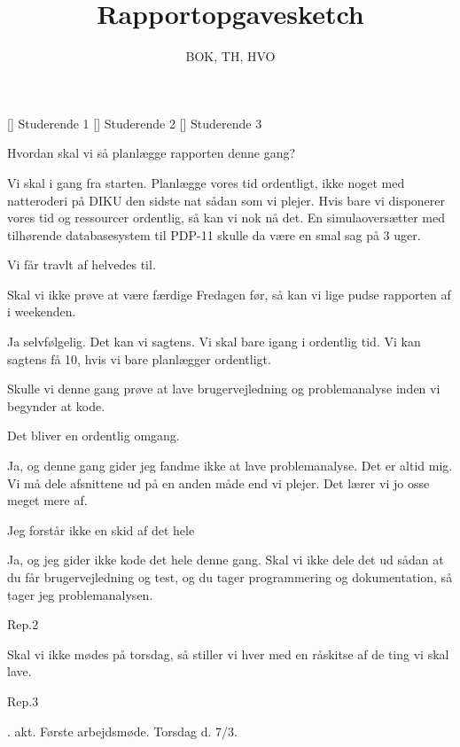 \documentclass[a4paper,11pt]{article}
\title{Rapportopgavesketch}
\author{BOK, TH, HVO}
\begin{document}
\maketitle

\begin{roles}
[] Studerende 1
[] Studerende 2
[] Studerende 3
\end{roles}

\begin{sketch}

 Hvordan skal vi så planlægge rapporten denne gang?

 Vi skal i gang fra starten. Planlægge vores tid ordentligt, 
ikke noget med natteroderi på DIKU den sidste nat sådan som vi plejer.
Hvis bare vi disponerer vores tid og ressourcer
ordentlig, så kan vi nok nå det. En simulaoversætter
med tilhørende databasesystem til PDP-11 skulle da være en
smal sag på 3 uger.

 Vi får travlt af helvedes til. 

 Skal vi ikke prøve at være færdige Fredagen før,
så kan vi lige pudse rapporten af i weekenden.

 Ja selvfølgelig. Det kan vi sagtens. Vi skal bare igang i
ordentlig tid. Vi kan sagtens få 10, hvis vi bare planlægger
ordentligt.

 Skulle vi denne gang prøve at lave brugervejledning og
problemanalyse inden vi begynder at kode.

 Det bliver en ordentlig omgang. 

 Ja, og denne gang gider jeg fandme ikke at lave problemanalyse.
Det er altid mig. Vi må dele afsnittene ud på en anden måde end vi plejer.
Det lærer vi jo osse meget mere af.

 Jeg forstår ikke en skid af det hele 

 Ja, og jeg gider ikke kode det hele denne gang. Skal vi ikke
dele det ud sådan at du  får brugervejledning og test,
og du  tager programmering og dokumentation, så tager
jeg problemanalysen.

 Rep.2

 Skal vi ikke mødes på torsdag, så stiller vi hver med en 
råskitse af de ting vi skal lave.

 Rep.3

. akt. Første arbejdsmøde. Torsdag d. 7/3.


\end{sketch}
\end{document}
